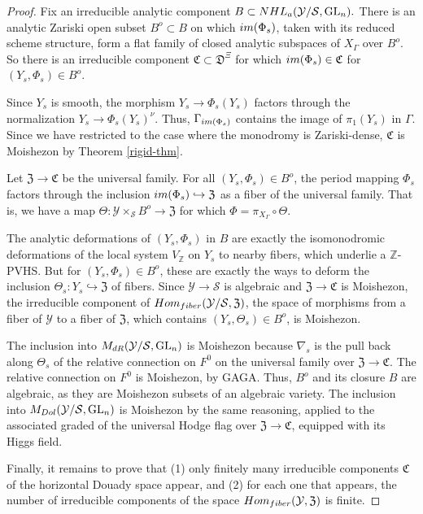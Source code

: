 \documentclass[10pt,letterpaper,english,reqno]{amsart}
\numberwithin{equation}{subsection}
\newcommand\cS{{\mathcal S}}
\newcommand\cY{{\mathcal Y}}
\newcommand\fC{{\mathfrak C}}
\newcommand\fD{{\mathfrak D}}
\newcommand\fZ{{\mathfrak Z}}
\newcommand\Z{{\mathbb Z}}
\DeclareMathOperator{\GL}{GL}
\newcommand\into{\hookrightarrow}
\theoremstyle{definition}
\begin{document}
\begin{proof}
 Fix an irreducible analytic component $B\subset {\rm NHL}_a(\cY/\cS,\GL_n).$
 There is an analytic Zariski open subset $B^o\subset B$ on which ${\rm im}(\Phi_s)$,
 taken with its reduced scheme structure, form
 a flat family of closed analytic subspaces of $X_\Gamma$ 
 over $B^o$.
So there is an irreducible component $\fC\subset \fD^{\Xi}$
 for which ${\rm im}(\Phi_s)\in \fC$ for $(Y_s,\Phi_s)\in B^o$.
 
 Since $Y_s$ is smooth, the
 morphism $Y_s\to \Phi_s(Y_s)$ factors through
 the normalization $Y_s\to \Phi_s(Y_s)^\nu$. Thus,
 $\Gamma_{\rm im(\Phi_s)}$ contains the image
 of $\pi_1(Y_s)$ in $\Gamma$. 
Since we have restricted to the case
 where the monodromy is Zariski-dense,
 $\fC$ is Moishezon by Theorem \ref{rigid-thm}.
 
 Let $\fZ\to \fC$ be the universal family. For all $(Y_s,\Phi_s)\in B^o$,
 the period mapping $\Phi_s$ factors through the inclusion
 ${\rm im}(\Phi_s)\into \fZ$ as a fiber
 of the universal family. That is, we have a map
 $\Theta\colon \cY \times_{\cS} B^o\to \fZ$ for which
 $\Phi = \pi_{X_\Gamma}\circ \Theta$.
 
 The analytic deformations of $(Y_s,\Phi_s)$ in $B$
 are exactly the isomonodromic deformations of the local system
 $V_{\Z}$ on $Y_s$ to nearby fibers, which
 underlie a $\Z$-PVHS. But for $(Y_s,\Phi_s)\in B^o$,
 these are exactly the ways to deform the inclusion
 $\Theta_s\colon Y_s\hookrightarrow \fZ$ of fibers.
 Since $\cY \to \cS$ is algebraic
 and $\fZ\to \fC$ is Moishezon, the irreducible component of
 ${\rm Hom}_{\rm fiber}(\cY/\cS,\fZ)$, the
 space of morphisms from a fiber of $\cY$
 to a fiber of $\fZ$, which contains 
 $(Y_s,\Theta_s)\in B^o$, is Moishezon.

The inclusion into 
$M_{\rm dR}(\cY/\cS,\GL_n)$ is Moishezon because $\nabla_s$ is the pull back
along $\Theta_s$ of
the relative connection on $F^0$
on the universal
family over $\fZ\to \fC$. The relative
connection on $F^0$ is Moishezon, by GAGA.
Thus, $B^o$ and its closure $B$ are algebraic, as they are
Moishezon subsets of an algebraic
variety. The inclusion
into $M_{\rm Dol}(\cY/\cS,\GL_n)$ is Moishezon
by the same reasoning, applied
to the associated graded
of the universal Hodge flag
over $\fZ\to\fC$, equipped with its Higgs field.\vspace{2pt}

Finally, it remains to prove that (1) only finitely
many irreducible components $\fC$ of the horizontal
Douady space appear, and (2) for each one that
appears, the number of irreducible components
of the space ${\rm Hom}_{\rm fiber}(\cY,\fZ)$
is finite.


\end{proof}
\end{document}
